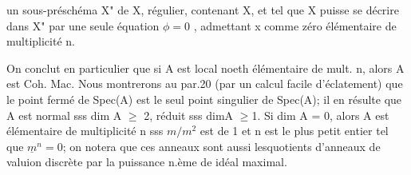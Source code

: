 
un sous-préschéma X" de X, régulier,  contenant X, et tel que X
puisse se décrire dans X" par une seule équation $\phi = 0$ , admettant x comme
zéro  élémentaire de multiplicité n.

On conclut en particulier que si A est local noeth élémentaire de
mult. n, alors A est Coh. Mac.  Nous montrerons au par.20
(par un calcul facile d'éclatement) que le point fermé de Spec(A) est
le seul point singulier de Spec(A); il en résulte que  A est normal
sss dim A $\geqslant$ 2, réduit sss dimA $\geqslant$1. Si dim A = 0, alors  A est élémentaire
de multiplicité n sss  $m/m^2$ est de 1 et  n est le plus petit entier
tel que $\underline{m}^n = 0$; on notera que ces anneaux sont aussi lesquotients d'anneaux
de valuion discrète par la puissance n.ème de  idéal maximal.

